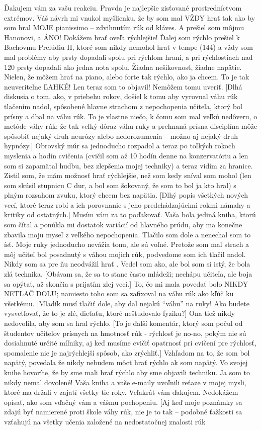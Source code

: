 Ďakujem vám za vašu reakciu. Pravda je najlepšie zisťované prostredníctvom extrémov. Váš návrh mi vnukol myšlienku, že by som mal VŽDY hrať tak ako by som hral MOJE pianissimo – zdvihnutím rúk od kláves. A prešiel som môjmu Hanonovi, a ÁNO! Dokážem hrať oveľa rýchlejšie! Ďalej som rýchlo prešiel k Bachovmu Prelúdiu II, ktoré som nikdy nemohol hrať v tempe (144) a vždy som mal problémy aby prsty dopadali spolu pri rýchlom hraní, a pri rýchlostiach nad 120 prsty dopadali ako jedna nota spolu. Žiadna nešikovnosť, žiadne napätie. Nielen, že môžem hrať na piano, alebo forte tak rýchlo, ako ja chcem. To je tak neuveriteľne ĽAHKÉ! Len teraz som to objavil! Nemôžem tomu uveriť. [Dlhá diskusia o tom, ako, v priebehu rokov, došiel k tomu aby vyrovnal váhu rúk tlačením nadol, spôsobené hlavne strachom z nepochopenia učiteľa, ktorý bol prísny a dbal na váhu rúk. To je vlastne niečo, k čomu som mal veľkú nedôveru, o metóde váhy rúk: že tak veľký dôraz váhu ruky a prehnaná prísna disciplína môže spôsobiť nejaký druh neurózy alebo nedorozumenia – možno aj nejaký druh hypnózy.] Obrovský múr sa jednoducho rozpadol a teraz po toľkých rokoch myslenia a hodín cvičenia (cvičil som až 10 hodín denne na konzervatóriu a len som si zapamätal hudbu, bez zlepšenia mojej techniky) a teraz vidím za hranice. Zistil som, že mám možnosť hrať rýchlejšie, než som kedy sníval som mohol (len som skúsil stupnicu C dur, a bol som šokovaný, že som to bol ja kto hral) s plným rozsahom zvuku, ktorý chcem bez napätia. [Dlhý popis všetkých nových vecí, ktoré teraz robí a ich porovnanie s jeho predchádzajúcimi rokmi námahy a kritiky od ostatných.] Musím vám za to poďakovať. Vaša bola jediná kniha, ktorú som čítal a ponúkla mi dostatok variácií  od hlavného prúdu, aby ma konečne zbavila moju myseľ z veľkého nepochopenia. Tlačilo som dole a nenechal som to ísť. Moje ruky jednoducho nevážia tonu, ale sú voľné. Pretože som mal strach a môj učiteľ bol posadnutý s váhou mojich rúk, podvedome som ich tlačil nadol. Nikdy som sa pre ňu neodvážil hrať . Vedel som ako, ale bol som si istý, že bola zlá technika. [Obávam sa, že sa to stane často mládeži; nechápu učiteľa, ale boja sa opýtať, až skončia s prijatím zlej veci.] To, čo mi mala povedať bolo NIKDY NETLAČ DOLU; namiesto toho som sa zafixoval na váhu rúk ako kľúč ku všetkému. [Mladík musí tlačiť dole, aby dal nejakú “váhu” na ruky! Ako budete vysvetľovať, že to je zlé, dieťaťu, ktoré neštudovalo fyziku?] Ona tiež nikdy nedovolila, aby som sa hral rýchlo. [To je ďalší komentár, ktorý som počul od študentov učiteľov prísnych na hmotnosť rúk - rýchlosť je no-no, pokým nie sú dosiahnuté určité míľniky, aj keď musíme cvičiť opatrnosť pri cvičení pre rýchlosť, spomalenie nie je najrýchlejší spôsob, ako zrýchliť.] Vzhľadom na to, že som bol napätý, povedala že nikdy nebudem môcť hrať rýchlo ak som napätý. Vo svojej knihe hovoríte, že by sme mali hrať rýchlo aby sme objavili techniku. Ja som to  nikdy nemal dovolené! Vaša kniha a vaše e-maily uvoľnili  reťaze v mojej mysli, ktoré ma držali v zajatí všetky tie roky. Veľakrát vám ďakujem. Nedokážem opísať, ako som vďačný vám a vášmu pochopeniu. [Aj keď moje poznámky sa zdajú byť namierené proti škole váhy rúk, nie je to tak –  podobné ťažkosti sa vzťahujú na všetky učenia založené na nedostatočnej znalosti rúk 